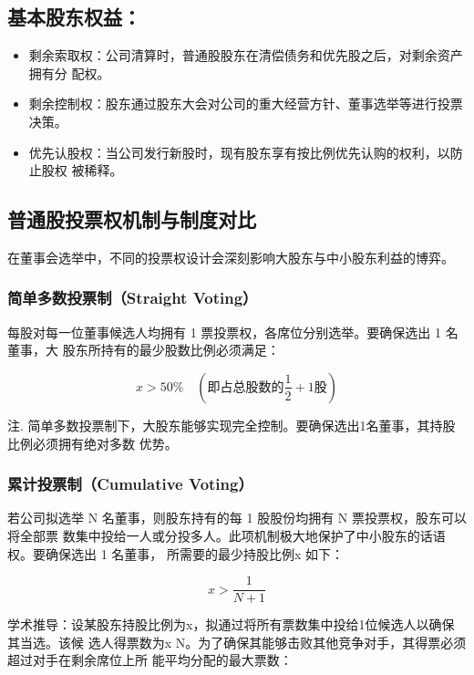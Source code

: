 \documentclass[lang=cn,10pt,color=blue]{elegantbook}
\begin{document}
\subsection{基本股东权益：}

\begin{itemize}
  \item 剩余索取权：公司清算时，普通股股东在清偿债务和优先股之后，对剩余资产拥有分 配权。

  \item 剩余控制权：股东通过股东大会对公司的重大经营方针、董事选举等进行投票决策。

  \item 优先认股权：当公司发行新股时，现有股东享有按比例优先认购的权利，以防止股权 被稀释。
\end{itemize}

\subsection{普通股投票权机制与制度对比}

在董事会选举中，不同的投票权设计会深刻影响大股东与中小股东利益的博弈。 

\subsubsection{简单多数投票制（Straight Voting）}

每股对每一位董事候选人均拥有 1 票投票权，各席位分别选举。要确保选出 1 名董事，大 股东所持有的最少股数比例必须满足： 

$$
\boxed {x > 50 \%} \quad (\text{即占总股数的} \frac {1}{2} + 1 \text{股})
$$

注. 简单多数投票制下，大股东能够实现完全控制。要确保选出1名董事，其持股比例必须拥有绝对多数 优势。 

\subsubsection{累计投票制（Cumulative Voting）}

若公司拟选举 N 名董事，则股东持有的每 1 股股份均拥有 N 票投票权，股东可以将全部票 数集中投给一人或分投多人。此项机制极大地保护了中小股东的话语权。要确保选出 1 名董事， 所需要的最少持股比例x 如下： 

$$
\boxed {x > \frac {1}{N + 1}}
$$

学术推导：设某股东持股比例为x，拟通过将所有票数集中投给1位候选人以确保其当选。该候 选人得票数为x N。为了确保其能够击败其他竞争对手，其得票必须超过对手在剩余席位上所 能平均分配的最大票数： 
\end{document}
